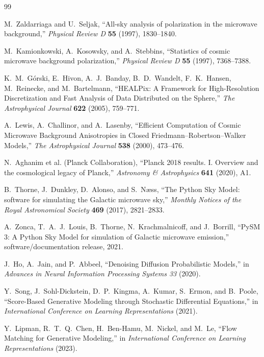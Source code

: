 \documentclass[11pt]{article}
\begin{document}
\begin{thebibliography}{99}

M.~Zaldarriaga and U.~Seljak,
``All-sky analysis of polarization in the microwave background,''
\emph{Physical Review D} \textbf{55} (1997), 1830--1840.

M.~Kamionkowski, A.~Kosowsky, and A.~Stebbins,
``Statistics of cosmic microwave background polarization,''
\emph{Physical Review D} \textbf{55} (1997), 7368--7388.

K.~M.~G\'orski, E.~Hivon, A.~J.~Banday, B.~D.~Wandelt, F.~K.~Hansen,
M.~Reinecke, and M.~Bartelmann,
``HEALPix: A Framework for High-Resolution Discretization and Fast Analysis of Data Distributed on the Sphere,''
\emph{The Astrophysical Journal} \textbf{622} (2005), 759--771.

A.~Lewis, A.~Challinor, and A.~Lasenby,
``Efficient Computation of Cosmic Microwave Background Anisotropies in Closed Friedmann--Robertson--Walker Models,''
\emph{The Astrophysical Journal} \textbf{538} (2000), 473--476.

N.~Aghanim et al. (Planck Collaboration),
``Planck 2018 results. I. Overview and the cosmological legacy of Planck,''
\emph{Astronomy \& Astrophysics} \textbf{641} (2020), A1.

B.~Thorne, J.~Dunkley, D.~Alonso, and S.~N{\ae}ss,
``The Python Sky Model: software for simulating the Galactic microwave sky,''
\emph{Monthly Notices of the Royal Astronomical Society} \textbf{469} (2017), 2821--2833.

A.~Zonca, T.~A.~J.~Louis, B.~Thorne, N.~Krachmalnicoff, and J.~Borrill,
``PySM 3: A Python Sky Model for simulation of Galactic microwave emission,''
software/documentation release, 2021.

J.~Ho, A.~Jain, and P.~Abbeel,
``Denoising Diffusion Probabilistic Models,''
in \emph{Advances in Neural Information Processing Systems 33} (2020).

Y.~Song, J.~Sohl-Dickstein, D.~P.~Kingma, A.~Kumar, S.~Ermon, and B.~Poole,
``Score-Based Generative Modeling through Stochastic Differential Equations,''
in \emph{International Conference on Learning Representations} (2021).

Y.~Lipman, R.~T.~Q.~Chen, H.~Ben-Hamu, M.~Nickel, and M.~Le,
``Flow Matching for Generative Modeling,''
in \emph{International Conference on Learning Representations} (2023).

\end{thebibliography}
\end{document}
